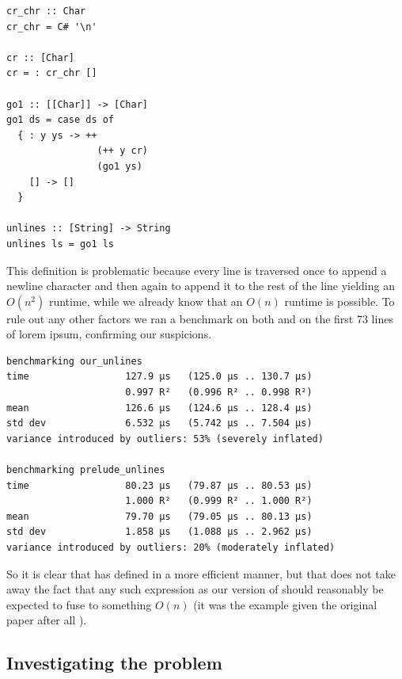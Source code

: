 \begin{listing}[H]
\begin{verbatim}
cr_chr :: Char
cr_chr = C# '\n'

cr :: [Char]
cr = : cr_chr []

go1 :: [[Char]] -> [Char]
go1 ds = case ds of
  { : y ys -> ++
                (++ y cr)
                (go1 ys)
    [] -> []
  }

unlines :: [String] -> String
unlines ls = go1 ls
\end{verbatim}
\end{listing}

This definition is problematic because every line is traversed once to append a newline character and then again to append it to the rest of the line
yielding an $O(n^2)$ runtime, while we already know that an $O(n)$ runtime is possible. To rule out any other factors we ran a benchmark on both
 and  on the first 73 lines of lorem ipsum, confirming our suspicions.

\begin{listing}[H]
\begin{verbatim}
benchmarking our_unlines
time                 127.9 μs   (125.0 μs .. 130.7 μs)
                     0.997 R²   (0.996 R² .. 0.998 R²)
mean                 126.6 μs   (124.6 μs .. 128.4 μs)
std dev              6.532 μs   (5.742 μs .. 7.504 μs)
variance introduced by outliers: 53% (severely inflated)

benchmarking prelude_unlines
time                 80.23 μs   (79.87 μs .. 80.53 μs)
                     1.000 R²   (0.999 R² .. 1.000 R²)
mean                 79.70 μs   (79.05 μs .. 80.13 μs)
std dev              1.858 μs   (1.088 μs .. 2.962 μs)
variance introduced by outliers: 20% (moderately inflated)
\end{verbatim}
\end{listing}

So it is clear that  has defined  in a more efficient manner, but that does not take away the fact that any such
expression as our version of  should reasonably be expected to fuse to something $O(n)$ (it was the example given the original paper after all \cite{shortcut_fusion}).

\subsection{Investigating the problem}

